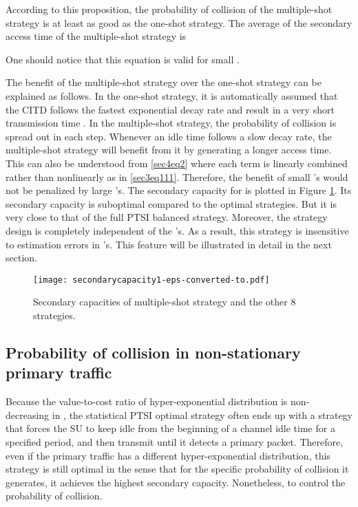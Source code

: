 \documentclass[10pt,final,journal,letterpaper]{IEEEtran}
\begin{document}
\par
According to this proposition, the probability of collision of the multiple-shot strategy is at least as good as the one-shot strategy. The average of the secondary access time of the multiple-shot strategy is

One should notice that this equation is valid for small .

\par
The benefit of the multiple-shot strategy over the one-shot strategy can be explained as follows. In the one-shot strategy, it is automatically assumed that the CITD follows the fastest exponential decay rate and result in a very short transmission time . In the multiple-shot strategy, the probability of collision is spread out in each step. Whenever an idle time follows a slow decay rate, the multiple-shot strategy will benefit from it by generating a longer access time. This can also be understood from \eqref{sec4eq2} where each term  is linearly combined rather than nonlinearly as in \eqref{sec3eq111}. Therefore, the benefit of small 's would not be penalized by large 's. The secondary capacity for  is plotted in Figure \ref{fig:sc1}. Its secondary capacity is suboptimal compared to the optimal strategies. But it is very close to that of the full PTSI balanced strategy. Moreover, the strategy design is completely independent of the 's. As a result, this strategy is insensitive to estimation errors in 's. This feature will be illustrated in detail in the next section.
\begin{figure}[!t]
\centering
\texttt{[image: secondarycapacity1-eps-converted-to.pdf]}
\caption{Secondary capacities of multiple-shot strategy and the other 8 strategies.}
\label{fig:sc1}
\end{figure}

\subsection{Probability of collision in non-stationary primary traffic}
Because the value-to-cost ratio of hyper-exponential distribution is non-decreasing in , the statistical PTSI optimal strategy often ends up with a strategy that forces the SU to keep idle from the beginning of a channel idle time for a specified period, and then transmit until it detects a primary packet. Therefore, even if the primary traffic has a different hyper-exponential distribution, this strategy is still optimal in the sense that for the specific probability of collision it generates, it achieves the highest secondary capacity. Nonetheless, to control the probability of collision.
\end{document}
